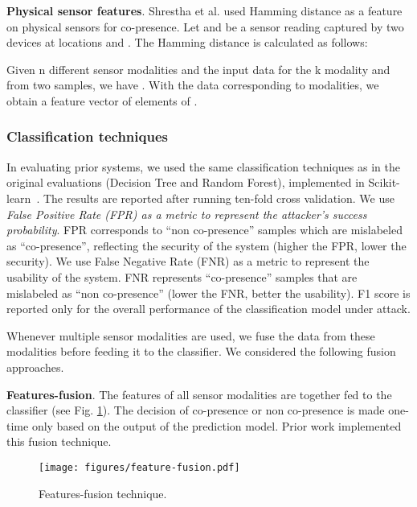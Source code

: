 {\textbf{Physical sensor features}. Shrestha et al. \cite{ShresthaFC2014} used Hamming distance as a feature on physical sensors for co-presence. 
Let  and  be a sensor reading captured by two devices at
locations  and . The Hamming distance is calculated as follows:

\begin{center}

\end{center}

Given n different sensor modalities and the input data for the k modality
 and  from
two samples, we have . With the 
data corresponding to  modalities, we obtain a feature vector of
 elements of .


\subsubsection{Classification techniques}

In evaluating prior systems, we used the same classification techniques as
in the original evaluations (Decision Tree and Random Forest), implemented in
Scikit-learn~\cite{scikit-learn}. The results are reported after running
ten-fold cross validation. 
We use \textit{False Positive Rate (FPR) as a metric to 
represent the attacker's success probability}.  FPR corresponds to ``non
co-presence'' samples which are mislabeled as ``co-presence'', reflecting the
security of the system (higher the FPR, lower the security).  We use False
Negative Rate (FNR) as a metric to represent the usability of the system. FNR
represents ``co-presence'' samples that are mislabeled as ``non co-presence''
(lower the FNR, better the usability).  F1 score is reported only for the
overall performance of the classification model under \zeromodal attack.



Whenever multiple sensor modalities are used, we fuse the data from these
modalities before feeding it to the classifier. We considered the following
fusion approaches.



\textbf{Features-fusion}. The features of all sensor modalities are together fed to the classifier (see Fig. \ref{fig:feature-fusion}). The
decision of co-presence or non co-presence is made one-time only based on the output of the prediction model. Prior work \cite{TruongPerCom14,ShresthaFC2014} implemented this fusion technique.

\begin{figure}[htpb] 
	\centering
	\texttt{[image: figures/feature-fusion.pdf]}
	\caption{Features-fusion technique.}
	\label{fig:feature-fusion}
\end{figure} 


}
